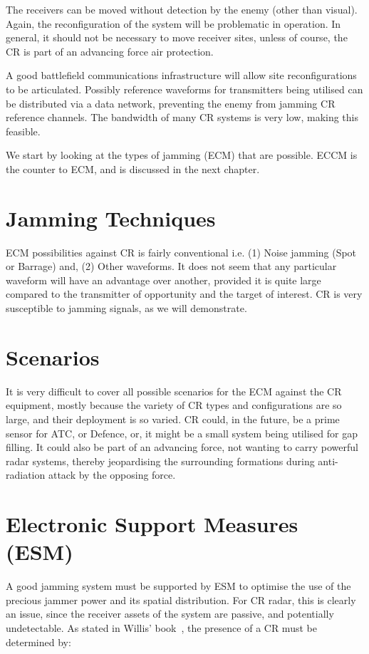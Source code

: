 \documentclass[english, 12pt]{report}
\begin{document}
The receivers can be moved without detection by the enemy (other than visual). Again, the reconfiguration of the system will be problematic in operation. In general, it should not be necessary to move receiver sites, unless of course, the CR is part of an advancing force air protection.

A good battlefield communications infrastructure will allow site reconfigurations to be articulated. Possibly reference waveforms for transmitters being utilised can be distributed via a data network, preventing the enemy from jamming CR reference channels. The bandwidth of many CR systems is very low, making this feasible.

We start by looking at the types of jamming (ECM) that are possible. ECCM is the counter to ECM, and is discussed in the next chapter. 


\section{Jamming Techniques}

ECM possibilities against CR is fairly conventional i.e. (1) Noise jamming (Spot or Barrage) and, (2) Other waveforms. It does not seem that any particular waveform will have an advantage over another, provided it is quite large compared to the transmitter of opportunity and the target of interest. CR is very susceptible to jamming signals, as we will demonstrate.

\section{Scenarios}

It is very difficult to cover all possible scenarios for the ECM against the CR equipment, mostly because the variety of CR types and configurations are so large, and their deployment is so varied. CR could, in the future, be a prime sensor for ATC, or Defence, or, it might be a small system being utilised for gap filling. It could also be part of an advancing force, not wanting to carry powerful radar systems, thereby jeopardising the surrounding formations during anti-radiation attack by the opposing force.

\section{Electronic Support Measures (ESM)}

A good jamming system must be supported by ESM to optimise the use of the precious jammer power and its spatial distribution. For CR radar, this is clearly an issue, since the receiver assets of the system are passive, and potentially undetectable. As stated in Willis' book~\cite{willis:07}, the presence of a CR must be determined by:
\end{document}
